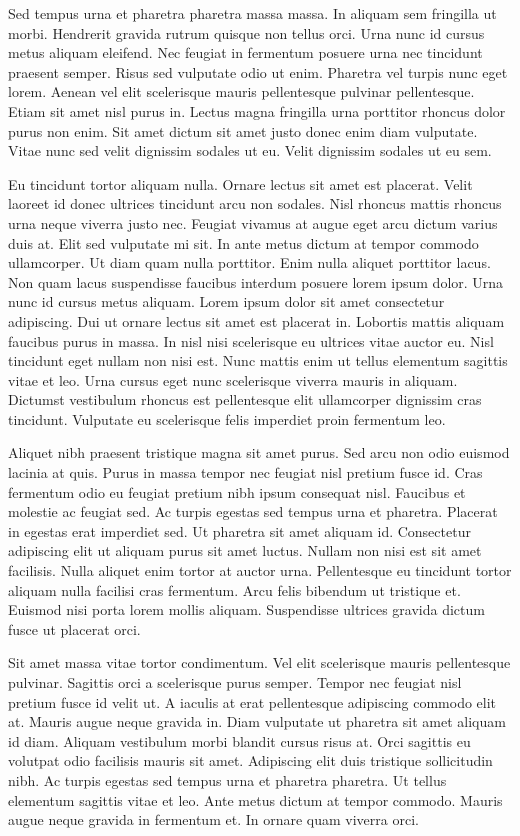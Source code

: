 \documentclass[11pt,a4paper]{article}
\begin{document}
Sed tempus urna et pharetra pharetra massa massa. In aliquam sem fringilla ut morbi. Hendrerit gravida rutrum quisque non tellus orci. Urna nunc id cursus metus aliquam eleifend. Nec feugiat in fermentum posuere urna nec tincidunt praesent semper. Risus sed vulputate odio ut enim. Pharetra vel turpis nunc eget lorem. Aenean vel elit scelerisque mauris pellentesque pulvinar pellentesque. Etiam sit amet nisl purus in. Lectus magna fringilla urna porttitor rhoncus dolor purus non enim. Sit amet dictum sit amet justo donec enim diam vulputate. Vitae nunc sed velit dignissim sodales ut eu. Velit dignissim sodales ut eu sem.

Eu tincidunt tortor aliquam nulla. Ornare lectus sit amet est placerat. Velit laoreet id donec ultrices tincidunt arcu non sodales. Nisl rhoncus mattis rhoncus urna neque viverra justo nec. Feugiat vivamus at augue eget arcu dictum varius duis at. Elit sed vulputate mi sit. In ante metus dictum at tempor commodo ullamcorper. Ut diam quam nulla porttitor. Enim nulla aliquet porttitor lacus. Non quam lacus suspendisse faucibus interdum posuere lorem ipsum dolor. Urna nunc id cursus metus aliquam. Lorem ipsum dolor sit amet consectetur adipiscing. Dui ut ornare lectus sit amet est placerat in. Lobortis mattis aliquam faucibus purus in massa. In nisl nisi scelerisque eu ultrices vitae auctor eu. Nisl tincidunt eget nullam non nisi est. Nunc mattis enim ut tellus elementum sagittis vitae et leo. Urna cursus eget nunc scelerisque viverra mauris in aliquam. Dictumst vestibulum rhoncus est pellentesque elit ullamcorper dignissim cras tincidunt. Vulputate eu scelerisque felis imperdiet proin fermentum leo.

Aliquet nibh praesent tristique magna sit amet purus. Sed arcu non odio euismod lacinia at quis. Purus in massa tempor nec feugiat nisl pretium fusce id. Cras fermentum odio eu feugiat pretium nibh ipsum consequat nisl. Faucibus et molestie ac feugiat sed. Ac turpis egestas sed tempus urna et pharetra. Placerat in egestas erat imperdiet sed. Ut pharetra sit amet aliquam id. Consectetur adipiscing elit ut aliquam purus sit amet luctus. Nullam non nisi est sit amet facilisis. Nulla aliquet enim tortor at auctor urna. Pellentesque eu tincidunt tortor aliquam nulla facilisi cras fermentum. Arcu felis bibendum ut tristique et. Euismod nisi porta lorem mollis aliquam. Suspendisse ultrices gravida dictum fusce ut placerat orci.

Sit amet massa vitae tortor condimentum. Vel elit scelerisque mauris pellentesque pulvinar. Sagittis orci a scelerisque purus semper. Tempor nec feugiat nisl pretium fusce id velit ut. A iaculis at erat pellentesque adipiscing commodo elit at. Mauris augue neque gravida in. Diam vulputate ut pharetra sit amet aliquam id diam. Aliquam vestibulum morbi blandit cursus risus at. Orci sagittis eu volutpat odio facilisis mauris sit amet. Adipiscing elit duis tristique sollicitudin nibh. Ac turpis egestas sed tempus urna et pharetra pharetra. Ut tellus elementum sagittis vitae et leo. Ante metus dictum at tempor commodo. Mauris augue neque gravida in fermentum et. In ornare quam viverra orci.
\end{document}
